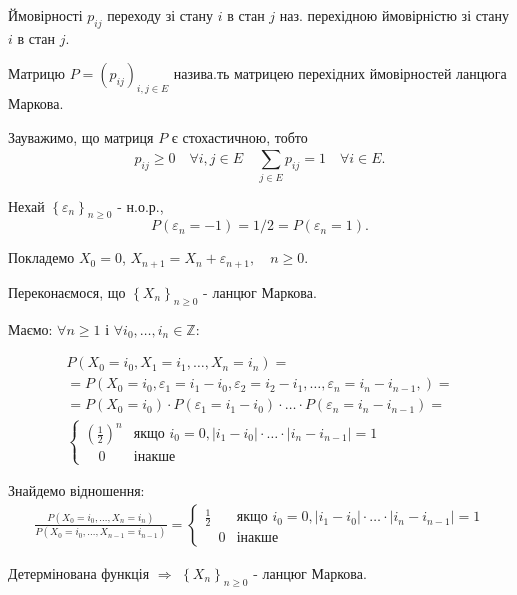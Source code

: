\begin{definition}
  Ймовірності $p_{ij}$ переходу зі стану $i$ в стан $j$ наз. перехідною ймовірністю зі стану
  $i$ в стан $j$.

  Матрицю $P = \left( p_{ij} \right) _{i,j \in E}$ назива.ть матрицею перехідних ймовірностей
  ланцюга Маркова.
\end{definition}

\begin{remark}
  Зауважимо, що матриця $P$ є стохастичною, тобто \[
  p_{ij} \geq 0 \quad \forall i,j \in E \quad \sum_{j \in E}^{} p_{ij} = 1
  \quad \forall i \in E
  .\]
\end{remark}


\begin{example}
Нехай $\left\{ \varepsilon_n \right\} _{n \geq 0}$ - н.о.р., \[
P\left( \varepsilon_n = -1 \right) = 1/2 = P\left( \varepsilon_n = 1 \right)
.\] 

Покладемо $X_0 = 0$,  $X_{n+1} = X_{n} + \varepsilon_{n+1}, \quad n \geq 0$.

Переконаємося, що $\left\{ X_{n} \right\}_{n \geq 0}$ - ланцюг Маркова.

Маємо: $\forall n \geq 1$ і  $\forall i_0,\ldots,i_n \in \mathbb{Z}$:

\begin{gather*}
P\left( X_0 = i_0, X_1 = i_1, \ldots, X_n = i_n \right) = \\
= P\left( X_{0} = i_0, \varepsilon_1 = i_1 - i_0, \varepsilon_2 = i_2 - i_1, \ldots,
    \varepsilon_n = i_n - i_{n-1},  \right) = \\
= P\left( X_0 = i_0 \right) \cdot P\left( \varepsilon_1 = i_1 - i_0 \right) \cdot \ldots
  \cdot P\left( \varepsilon_n = i_n - i_{n-1} \right) = \\
  \begin{cases}
    \left( \frac{1}{2} \right) ^n & \text{якщо } i_0 = 0, |i_1 - i_0| \cdot \ldots \cdot |i_n - i_{n-1}| = 1 \\
    \quad 0 & \text{інакше}
  \end{cases}
\end{gather*}

Знайдемо відношення:
\begin{gather*}
  \frac{P\left( X_0 = i_0, \ldots, X_n = i_n \right)}{P\left( X_0 = i_0,\ldots, X_{n-1} = i_{n-1} \right) }
  = 
  \begin{cases}
    \frac{1}{2} & \text{якщо } i_0 = 0, |i_1 - i_0| \cdot \ldots \cdot |i_n - i_{n-1}| = 1 \\
    \quad 0 & \text{інакше}
  \end{cases}
\end{gather*}

Детермінована функція $\Rightarrow$ $\left\{ X_n \right\}_{n\geq 0}$ - ланцюг Маркова.
\end{example}


